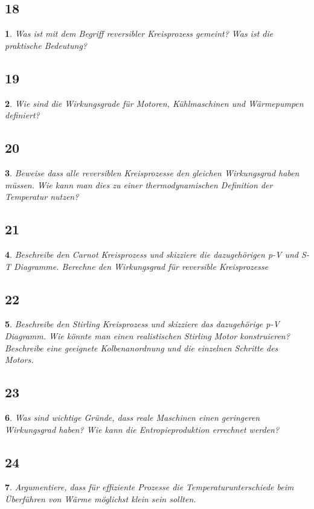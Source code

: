 \documentclass[12pt,a4paper]{report}
\newtheorem{myfrag}{}%
\begin{document}
\subsection{18}
\begin{myfrag}
Was ist mit dem Begriff reversibler Kreisprozess gemeint? Was ist die praktische
Bedeutung?
\end{myfrag}
\subsection{19}
\begin{myfrag}
Wie sind die Wirkungsgrade für Motoren, Kühlmaschinen und Wärmepumpen
definiert?
\end{myfrag}
\subsection{20}
\begin{myfrag}
Beweise dass alle reversiblen Kreisprozesse den gleichen Wirkungsgrad haben
müssen. Wie kann man dies zu einer thermodynamischen Definition der
Temperatur nutzen?
\end{myfrag}
\subsection{21}
\begin{myfrag}
Beschreibe den Carnot Kreisprozess und skizziere die dazugehörigen p-V und S-T
Diagramme. Berechne den Wirkungsgrad für reversible Kreisprozesse
\end{myfrag}
\subsection{22}
\begin{myfrag}
Beschreibe den Stirling Kreisprozess und skizziere das dazugehörige p-V
Diagramm. Wie könnte man einen realistischen Stirling Motor konstruieren?
Beschreibe eine geeignete Kolbenanordnung und die einzelnen Schritte des
Motors.
\end{myfrag}
\subsection{23}
\begin{myfrag}
Was sind wichtige Gründe, dass reale Maschinen einen geringeren Wirkungsgrad
haben? Wie kann die Entropieproduktion errechnet werden?
\end{myfrag}
\subsection{24}
\begin{myfrag}
Argumentiere, dass für effiziente Prozesse die Temperaturunterschiede beim
Überführen von Wärme möglichst klein sein sollten.
\end{myfrag}
\end{document}
